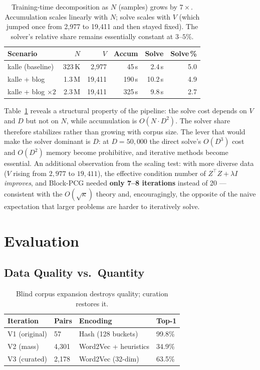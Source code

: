\documentclass[11pt,a4paper]{article}
\begin{document}
\begin{table}[h]
\centering\small
\begin{tabular}{@{}lrrrrr@{}}
\toprule
Scenario & $N$ & $V$ & Accum & Solve & Solve\,\% \\
\midrule
kalle (baseline)         & 323\,K  & 2{,}977  &  45\,s & 2.4\,s & 5.0 \\
kalle + blog             & 1.3\,M  & 19{,}411 & 190\,s & 10.2\,s & 4.9 \\
kalle + blog $\times 2$  & 2.3\,M  & 19{,}411 & 325\,s & 9.8\,s & 2.7 \\
\bottomrule
\end{tabular}
\caption{Training-time decomposition as $N$ (samples) grows by $7\times$. Accumulation scales linearly with $N$; solve scales with $V$ (which jumped once from 2{,}977 to 19{,}411 and then stayed fixed). The solver's relative share remains essentially constant at $3$--$5\%$.}
\label{tab:scaling}
\end{table}

Table~\ref{tab:scaling} reveals a structural property of the pipeline: the solve cost depends on $V$ and $D$ but not on $N$, while accumulation is $O(N \cdot D^2)$. The solver share therefore stabilizes rather than growing with corpus size. The lever that would make the solver dominant is $D$: at $D = 50{,}000$ the direct solve's $O(D^3)$ cost and $O(D^2)$ memory become prohibitive, and iterative methods become essential. An additional observation from the scaling test: with more diverse data ($V$ rising from $2{,}977$ to $19{,}411$), the effective condition number of $Z^\top Z + \lambda I$ \emph{improves}, and Block-PCG needed \textbf{only 7--8 iterations} instead of 20 --- consistent with the $O(\sqrt{\kappa})$ theory and, encouragingly, the opposite of the naive expectation that larger problems are harder to iteratively solve.


\section{Evaluation}

\subsection{Data Quality vs.\ Quantity}

\begin{table}[h]
\centering\small
\begin{tabular}{@{}llll@{}}
\toprule
Iteration & Pairs & Encoding & Top-1 \\
\midrule
V1 (original) & 57    & Hash (128 buckets)   & 99.8\% \\
V2 (mass)     & 4,301 & Word2Vec + heuristics & 34.9\% \\
V3 (curated)  & 2,178 & Word2Vec (32-dim)    & 63.5\% \\
\bottomrule
\end{tabular}
\caption{Blind corpus expansion destroys quality; curation restores it.}
\end{table}
\end{document}
